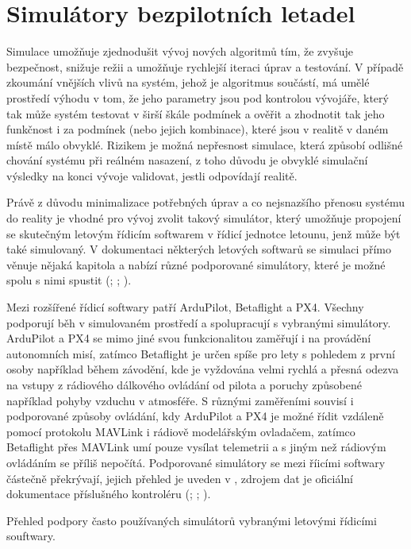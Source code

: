 \chapter{Simulátory bezpilotních letadel}
    Simulace umožňuje zjednodušit vývoj nových algoritmů tím, že zvyšuje bezpečnost, snižuje režii a umožňuje rychlejší iteraci úprav a testování. V případě zkoumání vnějších vlivů na systém, jehož je algoritmus součástí, má umělé prostředí výhodu v tom, že jeho parametry jsou pod kontrolou vývojáře, který tak může systém testovat v širší škále podmínek a ověřit a zhodnotit tak jeho funkčnost i za podmínek (nebo jejich kombinace), které jsou v realitě v daném místě málo obvyklé. Rizikem je možná nepřesnost simulace, která způsobí odlišné chování systému při reálném nasazení, z toho důvodu je obvyklé simulační výsledky na konci vývoje validovat, jestli odpovídají realitě.

    Právě z důvodu minimalizace potřebných úprav a co nejsnazšího přenosu systému do reality je vhodné pro vývoj zvolit takový simulátor, který umožňuje propojení se skutečným letovým řídicím softwarem v řídicí jednotce letounu, jenž může být také simulovaný. V dokumentaci některých letových softwarů se simulaci přímo věnuje nějaká kapitola a nabízí různé podporované simulátory, které je možné spolu s nimi spustit (\cite{px4:simulation}; \cite{ardupilot:simulation}; \cite{betaflight:simulation}).

    Mezi rozšířené řídicí softwary patří ArduPilot, Betaflight a PX4. Všechny podporují běh v simulovaném prostředí a spolupracují s vybranými simulátory. ArduPilot a PX4 se mimo jiné svou funkcionalitou zaměřují i na provádění autonomních misí, zatímco Betaflight je určen spíše pro lety s pohledem z první osoby například během závodění, kde je vyždována velmi rychlá a přesná odezva na vstupy z rádiového dálkového ovládání od pilota a poruchy způsobené například pohyby vzduchu v atmosféře. S různými zaměřeními souvisí i podporované způsoby ovládání, kdy ArduPilot a PX4 je možné řídit vzdáleně pomocí protokolu MAVLink i rádiově modelářským ovladačem, zatímco Betaflight přes MAVLink umí pouze vysílat telemetrii a s jiným než rádiovým ovládáním se příliš nepočítá. Podporované simulátory se mezi říicími softwary částečně překrývají, jejich přehled je uveden v , zdrojem dat je oficiální dokumentace příslušného kontroléru (\cite{px4:simulation}; \cite{ardupilot:simulation}; \cite{betaflight:simulation}).

    \begin{table}
        \centering
        
        \caption[Simulátory podporované kontrolérem letounu]{Přehled podpory často používaných simulátorů vybranými letovými řídicími souftwary.}
        \label{tab:sims}
    \end{table}

